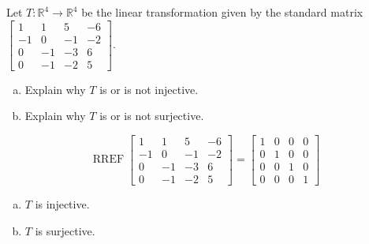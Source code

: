 
\begin{exerciseStatement}
 Let \(T:\mathbb{R}^ 4  \to \mathbb{R}^ 4 \) be the linear transformation given by the standard matrix \( \left[\begin{array}{cccc}
1 & 1 & 5 & -6 \\
-1 & 0 & -1 & -2 \\
0 & -1 & -3 & 6 \\
0 & -1 & -2 & 5
\end{array}\right] .\)
\begin{enumerate}[(a)]
\item Explain why \(T\) is or is not injective.
\item Explain why \(T\) is or is not surjective.
\end{enumerate}
    
\end{exerciseStatement}
    
\begin{exerciseAnswer} 


\[\operatorname{RREF} \left[\begin{array}{cccc}
1 & 1 & 5 & -6 \\
-1 & 0 & -1 & -2 \\
0 & -1 & -3 & 6 \\
0 & -1 & -2 & 5
\end{array}\right] = \left[\begin{array}{cccc}
1 & 0 & 0 & 0 \\
0 & 1 & 0 & 0 \\
0 & 0 & 1 & 0 \\
0 & 0 & 0 & 1
\end{array}\right] \]


\begin{enumerate}[(a)]
\item \(T\) is injective.
\item \(T\) is surjective.
\end{enumerate}
    
\end{exerciseAnswer}
    
